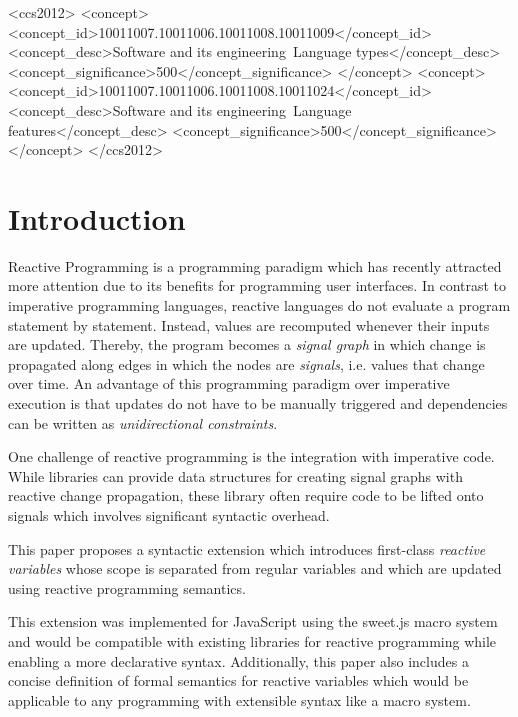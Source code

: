 \documentclass{sig-alternate-05-2015}
\begin{document}
%
%
\begin{CCSXML}
<ccs2012>
<concept>
<concept_id>10011007.10011006.10011008.10011009</concept_id>
<concept_desc>Software and its engineering~Language types</concept_desc>
<concept_significance>500</concept_significance>
</concept>
<concept>
<concept_id>10011007.10011006.10011008.10011024</concept_id>
<concept_desc>Software and its engineering~Language features</concept_desc>
<concept_significance>500</concept_significance>
</concept>
</ccs2012>
\end{CCSXML}


\printccsdesc


\section{Introduction}

Reactive Programming is a programming paradigm which has recently attracted more attention due to its benefits for programming user interfaces.  In contrast to imperative programming languages, reactive languages do not evaluate a program statement by statement.  Instead, values are recomputed whenever their inputs are updated.  Thereby, the program becomes a \emph{signal graph} in which change is propagated along edges in which the nodes are \emph{signals}, i.e. values that change over time.  An advantage of this programming paradigm over imperative execution is that updates do not have to be manually triggered and dependencies can be written as \emph{unidirectional constraints}.

One challenge of reactive programming is the integration with imperative code.  While libraries can provide data structures for creating signal graphs with reactive change propagation, these library often require code to be lifted onto signals which involves significant syntactic overhead.

This paper proposes a syntactic extension which introduces first-class \emph{reactive variables} whose scope is separated from regular variables and which are updated using reactive programming semantics.

This extension was implemented for JavaScript using the sweet.js macro system and would be compatible with existing libraries for reactive programming while enabling a more declarative syntax.  Additionally, this paper also includes a concise definition of formal semantics for reactive variables which would be applicable to any programming with extensible syntax like a macro system.
\end{document}

